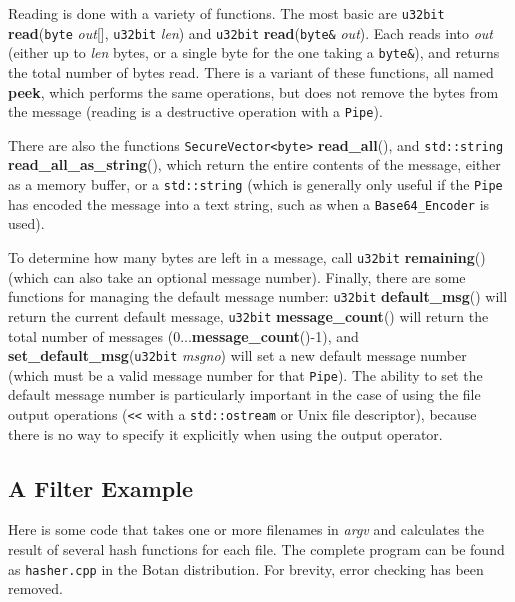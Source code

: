 \documentclass{article}
\newcommand{\filename}[1]{\texttt{#1}}
\newcommand{\function}[1]{\textbf{#1}}
\newcommand{\type}[1]{\texttt{#1}}
\renewcommand{\arg}[1]{\textsl{#1}}
\begin{document}
Reading is done with a variety of functions. The most basic are \type{u32bit}
\function{read}(\type{byte} \arg{out}[], \type{u32bit} \arg{len}) and
\type{u32bit} \function{read}(\type{byte\&} \arg{out}). Each reads into
\arg{out} (either up to \arg{len} bytes, or a single byte for the one taking a
\type{byte\&}), and returns the total number of bytes read. There is a variant
of these functions, all named \function{peek}, which performs the same
operations, but does not remove the bytes from the message (reading is a
destructive operation with a \type{Pipe}).

There are also the functions \type{SecureVector<byte>} \function{read\_all}(),
and \type{std::string} \function{read\_all\_as\_string}(), which return the
entire contents of the message, either as a memory buffer, or a
\type{std::string} (which is generally only useful if the \type{Pipe} has
encoded the message into a text string, such as when a \type{Base64\_Encoder}
is used).

To determine how many bytes are left in a message, call \type{u32bit}
\function{remaining}() (which can also take an optional message
number). Finally, there are some functions for managing the default message
number: \type{u32bit} \function{default\_msg}() will return the current default
message, \type{u32bit} \function{message\_count}() will return the total number
of messages (0...\function{message\_count}()-1), and
\function{set\_default\_msg}(\type{u32bit} \arg{msgno}) will set a new default
message number (which must be a valid message number for that \type{Pipe}). The
ability to set the default message number is particularly important in the case
of using the file output operations (\verb|<<| with a \type{std::ostream} or
Unix file descriptor), because there is no way to specify it explicitly when
using the output operator.

\subsection{A Filter Example}

Here is some code that takes one or more filenames in \arg{argv} and
calculates the result of several hash functions for each file. The complete
program can be found as \filename{hasher.cpp} in the Botan distribution. For
brevity, error checking has been removed.
\end{document}
